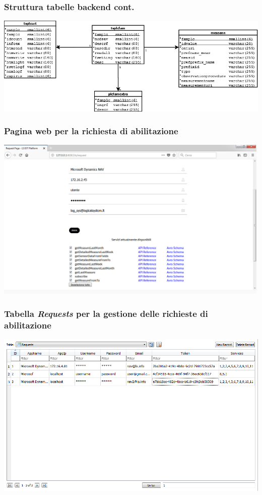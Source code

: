 \documentclass{beamer}
\begin{document}
\begin{frame}
\frametitle{Struttura tabelle backend cont.}
\includegraphics[width=1\textwidth]{images/tabelle-ontologia.png}
\end{frame}

\begin{frame}
\frametitle{Pagina web per la richiesta di abilitazione}
\includegraphics[width=1\textwidth]{images/RequestPagePlatform.png}
\end{frame}

\begin{frame}
\frametitle{Tabella \textit{Requests} per la gestione delle richieste di abilitazione}
\includegraphics[width=1\textwidth]{images/DBPlatform2.png}
\end{frame}
\end{document}

